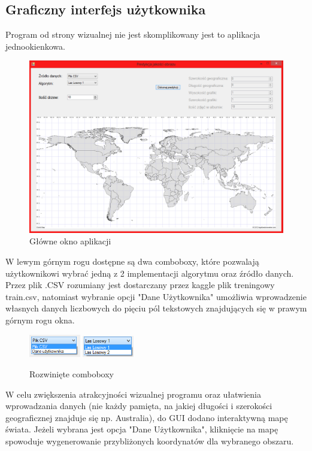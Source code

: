 \documentclass[a4paper,twoside]{article}
\begin{document}
\subsection{Graficzny interfejs użytkownika}

Program od strony wizualnej nie jest skomplikowany jest to aplikacja jednookienkowa.

\begin{figure}[h]
	\centering
	\includegraphics[width=1\textwidth]{./img/001.png}
	\caption{Główne okno aplikacji}
\end{figure}

W lewym górnym rogu dostępne są dwa comboboxy, które pozwalają użytkownikowi wybrać jedną z 2 implementacji algorytmu oraz źródło danych. Przez plik .CSV rozumiany jest dostarczany przez kaggle plik treningowy train.csv, natomiast wybranie opcji "Dane Użytkownika" umożliwia wprowadzenie własnych danych liczbowych do pięciu pól tekstowych znajdujących się w prawym górnym rogu okna.

\begin{figure}[h]
	\centering
	\includegraphics[width=0.2\textwidth]{./img/02.png}
	\includegraphics[width=0.2\textwidth]{./img/03.png}
	\caption{Rozwinięte comboboxy}
\end{figure}

W celu zwiększenia atrakcyjności wizualnej programu oraz ułatwienia wprowadzania danych (nie każdy pamięta, na jakiej długości i szerokości geograficznej znajduje się np. Australia), do GUI dodano interaktywną mapę świata. Jeżeli wybrana jest opcja "Dane Użytkownika", kliknięcie na mapę spowoduje wygenerowanie przybliżonych koordynatów dla wybranego obszaru.
\end{document}
